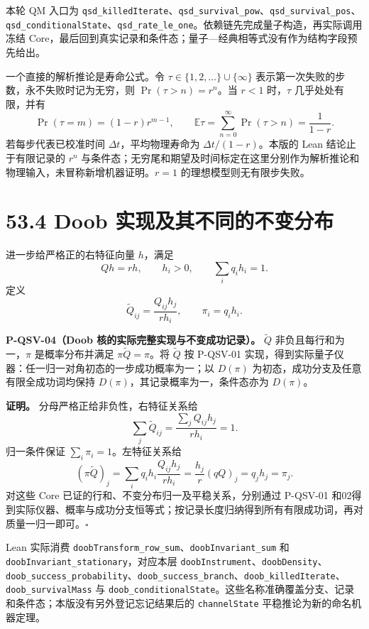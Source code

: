 \documentclass[
  11pt,
  oneside]{book}
\begin{document}
本轮 QM 入口为
\texttt{qsd\_\allowbreak killedIterate}、\allowbreak \texttt{qsd\_\allowbreak survival\_\allowbreak pow}、\allowbreak \texttt{qsd\_\allowbreak survival\_\allowbreak pos}、\allowbreak \texttt{qsd\_\allowbreak conditionalState}、\allowbreak \texttt{qsd\_\allowbreak rate\_\allowbreak le\_\allowbreak one}。依赖链先完成量子构造，再实际调用冻结
Core，最后回到真实记录和条件态；量子---经典相等式没有作为结构字段预先给出。

一个直接的解析推论是寿命公式。令 \(\tau\in\{1,2,\ldots\}\cup\{\infty\}\)
表示第一次失败的步数，永不失败时记为无穷，则 \(\Pr(\tau>n)=r^n\)。当
\(r<1\) 时，\(\tau\) 几乎处处有限，并有 \[
\Pr(\tau=m)=(1-r)r^{m-1},\qquad
\mathbb E\tau=\sum_{n=0}^{\infty}\Pr(\tau>n)=\frac1{1-r}.
\] 若每步代表已校准时间 \(\Delta t\)，平均物理寿命为
\(\Delta t/(1-r)\)。本版的 Lean 结论止于有限记录的 \(r^n\)
与条件态；无穷尾和期望及时间标定在这里分别作为解析推论和物理输入，未冒称新增机器证明。\(r=1\)
的理想模型则无有限步失败。

\hypertarget{doob-ux5b9eux73b0ux53caux5176ux4e0dux540cux7684ux4e0dux53d8ux5206ux5e03}{%
\section{53.4 Doob
实现及其不同的不变分布}\label{doob-ux5b9eux73b0ux53caux5176ux4e0dux540cux7684ux4e0dux53d8ux5206ux5e03}}

进一步给严格正的右特征向量 \(h\)，满足 \[
Qh=rh,\qquad h_i>0,\qquad \sum_iq_ih_i=1.
\] 定义 \[
\widetilde Q_{ij}=\frac{Q_{ij}h_j}{rh_i},\qquad \pi_i=q_ih_i.
\]

\protect\hypertarget{p-qsv-04}{}{}

\textbf{P-QSV-04（Doob 核的实际完整实现与不变成功记录）。}
\(\widetilde Q\) 非负且每行和为一，\(\pi\) 是概率分布并满足
\(\pi\widetilde Q=\pi\)。将 \(\widetilde Q\) 按 P-QSV-01
实现，得到实际量子仪器：任一归一对角初态的一步成功概率为一；以
\(D(\pi)\) 为初态，成功分支及任意有限全成功词均保持
\(D(\pi)\)，其记录概率为一，条件态亦为 \(D(\pi)\)。

\textbf{证明。} 分母严格正给非负性，右特征关系给 \[
\sum_j\widetilde Q_{ij}=\frac{\sum_jQ_{ij}h_j}{rh_i}=1.
\] 归一条件保证 \(\sum_i\pi_i=1\)。左特征关系给 \[
(\pi\widetilde Q)_j
=\sum_iq_ih_i\frac{Q_{ij}h_j}{rh_i}
=\frac{h_j}{r}(qQ)_j=q_jh_j=\pi_j.
\] 对这些 Core 已证的行和、不变分布归一及平稳关系，分别通过 P-QSV-01
和02得到实际仪器、概率与成功分支恒等式；按记录长度归纳得到所有有限成功词，再对质量一归一即可。\(\square\)

Lean 实际消费
\texttt{doobTransform\_\allowbreak row\_\allowbreak sum}、\allowbreak \texttt{doobInvariant\_\allowbreak sum} 和
\texttt{doobInvariant\_\allowbreak stationary}，对应本层
\texttt{doobInstrument}、\allowbreak \texttt{doobDensity}、\allowbreak \texttt{doob\_\allowbreak success\_\allowbreak probability}、\allowbreak \texttt{doob\_\allowbreak success\_\allowbreak branch}、\allowbreak \texttt{doob\_\allowbreak killedIterate}、\allowbreak \texttt{doob\_\allowbreak survivalMass}
与
\texttt{doob\_\allowbreak conditionalState}。这些名称准确覆盖分支、记录和条件态；本版没有另外登记忘记结果后的
\texttt{channelState} 平稳推论为新的命名机器定理。
\end{document}
